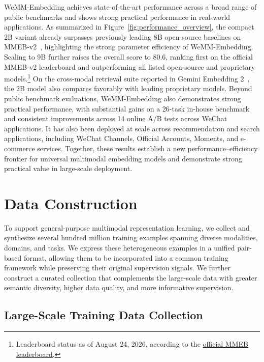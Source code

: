 \documentclass[]{wechat}
\begin{document}
WeMM-Embedding achieves state-of-the-art performance across a broad range of public benchmarks and shows strong practical performance in real-world applications. As summarized in Figure~\ref{fig:performance_overview}, the compact 2B variant already surpasses previously leading 8B open-source baselines on MMEB-v2~\cite{vlm2vec-v2}, highlighting the strong parameter efficiency of WeMM-Embedding. Scaling to 9B further raises the overall score to 80.6, ranking first on the official MMEB-v2 leaderboard and outperforming all listed open-source and proprietary models.\footnote{Leaderboard status as of August 24, 2026, according to the \href{https://huggingface.co/spaces/TIGER-Lab/MMEB-Leaderboard}{official MMEB leaderboard}.} On the cross-modal retrieval suite reported in Gemini Embedding 2~\cite{gemini-emb-2}, the 2B model also compares favorably with leading proprietary models. Beyond public benchmark evaluations, WeMM-Embedding also demonstrates strong practical performance, with substantial gains on a 26-task in-house benchmark and consistent improvements across 14 online A/B tests across WeChat applications. It has also been deployed at scale across recommendation and search applications, including WeChat Channels, Official Accounts, Moments, and e-commerce services. Together, these results establish a new performance--efficiency frontier for universal multimodal embedding models and demonstrate strong practical value in large-scale deployment.




\section{Data Construction}
\label{sec:data}

To support general-purpose multimodal representation learning, we collect and synthesize several hundred million training examples spanning diverse modalities, domains, and tasks. We express these heterogeneous examples in a unified pair-based format, allowing them to be incorporated into a common training framework while preserving their original supervision signals. We further construct a curated collection that complements the large-scale data with greater semantic diversity, higher data quality, and more informative supervision.

\subsection{Large-Scale Training Data Collection}
\label{sec:data_collection}
\end{document}
